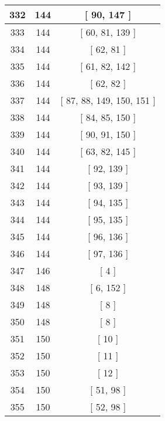 \begin{center}
\begin{longtable}[H]{|| c c c ||}
332 & 144 & [ 90, 147 ]
\\\hline
333 & 144 & [ 60, 81, 139 ]
\\\hline
334 & 144 & [ 62, 81 ]
\\\hline
335 & 144 & [ 61, 82, 142 ]
\\\hline
336 & 144 & [ 62, 82 ]
\\\hline
337 & 144 & [ 87, 88, 149, 150, 151 ]
\\\hline
338 & 144 & [ 84, 85, 150 ]
\\\hline
339 & 144 & [ 90, 91, 150 ]
\\\hline
340 & 144 & [ 63, 82, 145 ]
\\\hline
341 & 144 & [ 92, 139 ]
\\\hline
342 & 144 & [ 93, 139 ]
\\\hline
343 & 144 & [ 94, 135 ]
\\\hline
344 & 144 & [ 95, 135 ]
\\\hline
345 & 144 & [ 96, 136 ]
\\\hline
346 & 144 & [ 97, 136 ]
\\\hline
347 & 146 & [ 4 ]
\\\hline
348 & 148 & [ 6, 152 ]
\\\hline
349 & 148 & [ 8 ]
\\\hline
350 & 148 & [ 8 ]
\\\hline
351 & 150 & [ 10 ]
\\\hline
352 & 150 & [ 11 ]
\\\hline
353 & 150 & [ 12 ]
\\\hline
354 & 150 & [ 51, 98 ]
\\\hline
355 & 150 & [ 52, 98 ]
\\\hline
\end{longtable}
\end{center}
